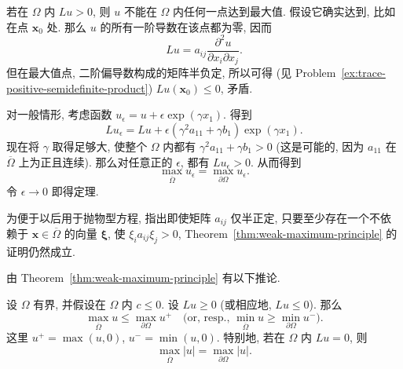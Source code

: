 \begin{Proof}
若在 $\Omega$ 内 $Lu>0$, 则 $u$ 不能在 $\Omega$ 内任何一点达到最大值. 假设它确实达到, 比如在点 $\bm{x}_0$ 处. 那么 $u$ 的所有一阶导数在该点都为零, 因而
\begin{equation}\label{eq:elliptic-operator-at-critical-point}
Lu=a_{ij}\dfrac{\partial^2u}{\partial x_i\partial x_j}.
\end{equation}
但在最大值点, 二阶偏导数构成的矩阵半负定, 所以可得 (见 Problem~\ref{ex:trace-positive-semidefinite-product}) $Lu(\bm{x}_0)\leq0$, 矛盾.

对一般情形, 考虑函数 $u_\epsilon=u+\epsilon\exp(\gamma x_1)$. 得到
\begin{equation}\label{eq:weak-maximum-exponential-perturbation}
Lu_\epsilon=Lu+\epsilon(\gamma^2a_{11}+\gamma b_1)\exp(\gamma x_1).
\end{equation}
现在将 $\gamma$ 取得足够大, 使整个 $\Omega$ 内都有 $\gamma^2a_{11}+\gamma b_1>0$ (这是可能的, 因为 $a_{11}$ 在 $\overline\Omega$ 上为正且连续). 那么对任意正的 $\epsilon$, 都有 $Lu_\epsilon>0$. 从而得到
\begin{equation}\label{eq:weak-maximum-perturbed-boundary-equality}
\max_{\overline\Omega}u_\epsilon=\max_{\partial\Omega}u_\epsilon.
\end{equation}
令 $\epsilon\to0$ 即得定理.
\end{Proof}

\begin{Remark}
\label{rem:weak-maximum-semidefinite}
为便于以后用于抛物型方程, 指出即使矩阵 $a_{ij}$ 仅半正定, 只要至少存在一个不依赖于 $\bm{x}\in\overline\Omega$ 的向量 $\bm{\xi}$, 使 $\xi_i a_{ij}\xi_j>0$, Theorem~\ref{thm:weak-maximum-principle} 的证明仍然成立.
\end{Remark}

由 Theorem~\ref{thm:weak-maximum-principle} 有以下推论.

\begin{Corollary}
\label{cor:weak-maximum-nonpositive-zero-order}
设 $\Omega$ 有界, 并假设在 $\Omega$ 内 $c\leq0$. 设 $Lu\geq0$ (或相应地, $Lu\leq0$). 那么
\begin{equation}\label{eq:weak-maximum-positive-negative-parts}
\max_{\overline\Omega}u\leq\max_{\partial\Omega}u^+\quad\text{(or, resp., }\min_{\overline\Omega}u\geq\min_{\partial\Omega}u^-\text{)}.
\end{equation}
这里 $u^+=\max(u,0)$, $u^-=\min(u,0)$. 特别地, 若在 $\Omega$ 内 $Lu=0$, 则
\begin{equation}\label{eq:weak-maximum-absolute-value-boundary}
\max_{\overline\Omega}|u|=\max_{\partial\Omega}|u|.
\end{equation}

\end{Corollary}

